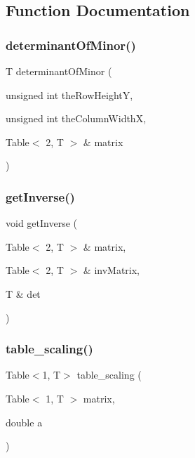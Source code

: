 \subsection{Function Documentation}
\mbox{\label{supplementary_functions_8h_a95bed1847eed9d7f9da90da4aa8fe7c1}} 
\subsubsection{\texorpdfstring{determinantOfMinor()}{determinantOfMinor()}}
{\footnotesize\ttfamily T determinant\+Of\+Minor (\begin{DoxyParamCaption}\item[{unsigned int}]{the\+Row\+HeightY,  }\item[{unsigned int}]{the\+Column\+WidthX,  }\item[{Table$<$ 2, T $>$ \&}]{matrix }\end{DoxyParamCaption})\hspace{0.3cm}{\ttfamily [inline]}}

\mbox{\label{supplementary_functions_8h_ade5a79ed03042894cbe451fc7e1ccdf1}} 
\subsubsection{\texorpdfstring{getInverse()}{getInverse()}}
{\footnotesize\ttfamily void get\+Inverse (\begin{DoxyParamCaption}\item[{Table$<$ 2, T $>$ \&}]{matrix,  }\item[{Table$<$ 2, T $>$ \&}]{inv\+Matrix,  }\item[{T \&}]{det }\end{DoxyParamCaption})\hspace{0.3cm}{\ttfamily [inline]}}

\mbox{\label{supplementary_functions_8h_ab98a2b7c384c7057fc9fca4a37350c63}} 
\subsubsection{\texorpdfstring{table\_scaling()}{table\_scaling()}\hspace{0.1cm}{\footnotesize\ttfamily [1/4]}}
{\footnotesize\ttfamily Table$<$1, T$>$ table\+\_\+scaling (\begin{DoxyParamCaption}\item[{Table$<$ 1, T $>$}]{matrix,  }\item[{double}]{a }\end{DoxyParamCaption})\hspace{0.3cm}{\ttfamily [inline]}}

